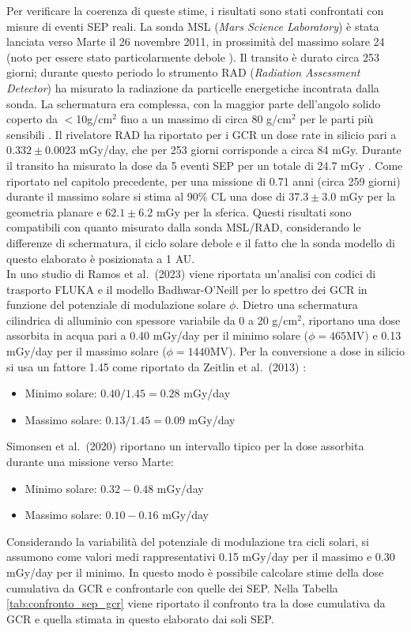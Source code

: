 \documentclass[12pt]{report}
\begin{document}
Per verificare la coerenza di queste stime, i risultati sono stati confrontati con misure di eventi SEP reali. La sonda MSL (\textit{Mars Science Laboratory}) \cite{nasa_msl_curiosity} è stata lanciata verso Marte il 26 novembre 2011, in prossimità del massimo solare 24 (noto per essere stato particolarmente debole \cite{Gopalswamy_2020}). Il transito è durato circa 253 giorni; durante questo periodo lo strumento RAD (\textit{Radiation Assessment Detector}) \cite{HASSLER20171} ha misurato la radiazione da particelle energetiche incontrata dalla sonda. La schermatura era complessa, con la maggior parte dell'angolo solido coperto da $<$10g/cm$^2$ fino a un massimo di circa 80 g/cm$^2$ per le parti più sensibili \cite{Zeitlin2013}. Il rivelatore RAD ha riportato per i GCR un dose rate in silicio pari a $0.332 \pm 0.0023$ mGy/day, che per 253 giorni corrisponde a circa 84 mGy. Durante il transito ha misurato la dose da 5 eventi SEP per un totale di 24.7 mGy \cite{zeitlin2013}. Come riportato nel capitolo precedente, per una missione di 0.71 anni (circa 259 giorni) durante il massimo solare si stima al 90\% CL una dose di $37.3 \pm 3.0$ mGy per la geometria planare e $62.1 \pm 6.2$ mGy per la sferica. Questi risultati sono compatibili con quanto misurato dalla sonda MSL/RAD, considerando le differenze di schermatura, il ciclo solare debole e  il fatto che la sonda modello di questo elaborato è posizionata a 1 AU. \\
In uno studio di Ramos et al.\ (2023) \cite{ramos2023} viene riportata un'analisi con codici di trasporto FLUKA \cite{ferrari2005fluka} e il modello Badhwar-O'Neill \cite{Badwar2020} per lo spettro dei GCR in funzione del potenziale di modulazione solare $\phi$. Dietro una schermatura cilindrica di alluminio con spessore variabile da 0 a 20 g/cm$^2$, riportano una dose assorbita in acqua pari a 0.40 mGy/day per il minimo solare ($\phi = 465 \text{MV})$ e 0.13 mGy/day per il massimo solare ($\phi= 1440 \text{MV}$). Per la conversione a dose in silicio si usa un fattore 1.45 come riportato da Zeitlin et al.\ (2013) \cite{zeitlin2013}:
\begin{itemize}[nosep]
    \item[-] Minimo solare: $0.40/1.45 = 0.28$ mGy/day
    \item[-] Massimo solare: $0.13/1.45 = 0.09$ mGy/day
\end{itemize}
Simonsen et al.\ (2020) \cite{Simonsen2020} riportano un intervallo tipico per la dose assorbita durante una missione verso Marte:

\begin{itemize}[nosep]
    \item [-] Minimo solare: $0.32-0.48$ mGy/day
    \item [-] Massimo solare: $0.10-0.16$ mGy/day 
\end{itemize}
Considerando la variabilità del potenziale di modulazione tra cicli solari, si assumono come valori  medi rappresentativi 0.15 mGy/day per il massimo e 0.30 mGy/day per il minimo. In questo modo è possibile calcolare stime della dose cumulativa da GCR e confrontarle con quelle dei SEP. Nella Tabella \ref{tab:confronto_sep_gcr} viene riportato il confronto tra la dose cumulativa da GCR e quella stimata in questo elaborato dai soli SEP. 
\end{document}
